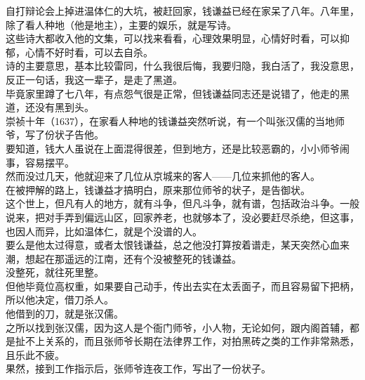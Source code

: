 \begin{multicols}{\theparacolNo}
自打辩论会上掉进温体仁的大坑，被赶回家，钱谦益已经在家呆了八年。八年里，除了看人种地（他是地主），主要的娱乐，就是写诗。\\

这些诗大都收入他的文集，可以找来看看，心理效果明显，心情好时看，可以抑郁，心情不好时看，可以去自杀。\\

诗的主要意思，基本比较雷同，什么我很后悔，我要归隐，我白活了，我没意思，反正一句话，我这一辈子，是走了黑道。\\

毕竟家里蹲了七八年，有点怨气很是正常，但钱谦益同志还是说错了，他走的黑道，还没有黑到头。\\

崇祯十年（1637），在家看人种地的钱谦益突然听说，有一个叫张汉儒的当地师爷，写了份状子告他。\\

要知道，钱大人虽说在上面混得很差，但到地方，还是比较恶霸的，小小师爷闹事，容易摆平。\\

然而没过几天，他就迎来了几位从京城来的客人——几位来抓他的客人。\\

在被押解的路上，钱谦益才搞明白，原来那位师爷的状子，是告御状。\\

这个世上，但凡有人的地方，就有斗争，但凡斗争，就有谱，包括政治斗争。一般说来，把对手弄到偏远山区，回家养老，也就够本了，没必要赶尽杀绝，但这事，也因人而异，比如温体仁，就是个没谱的人。\\

要么是他太过得意，或者太恨钱谦益，总之他没打算按着谱走，某天突然心血来潮，想起在那遥远的江南，还有个没被整死的钱谦益。\\

没整死，就往死里整。\\

但他毕竟位高权重，如果要自己动手，传出去实在太丢面子，而且容易留下把柄，所以他决定，借刀杀人。\\

他借到的刀，就是张汉儒。\\

之所以找到张汉儒，因为这人是个衙门师爷，小人物，无论如何，跟内阁首辅，都是扯不上关系的，而且张师爷长期在法律界工作，对拍黑砖之类的工作非常熟悉，且乐此不疲。\\

果然，接到工作指示后，张师爷连夜工作，写出了一份状子。\\


\end{multicols}
